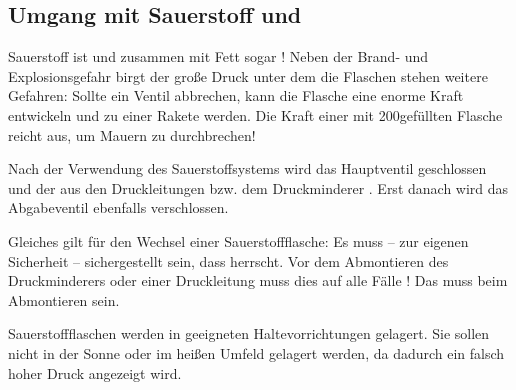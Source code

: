 \subsection{Umgang mit Sauerstoff und }

\TextSlide{\TxGefahren}
{%
Sauerstoff ist  und zusammen mit Fett
sogar ! Neben der Brand- und
Explosionsgefahr birgt der große Druck unter dem die Flaschen
stehen weitere Gefahren: Sollte ein Ventil abbrechen, kann die
Flasche eine enorme Kraft entwickeln und zu einer Rakete
werden. Die Kraft einer mit 200\Bar* gefüllten Flasche reicht
aus, um Mauern zu durchbrechen!


}{
}{}{}{}

{Nach der Verwendung des Sauerstoffsystems wird das
Hauptventil geschlossen und der  aus den
Druckleitungen bzw. dem Druckminderer . Erst
danach wird das Abgabeventil ebenfalls verschlossen.

Gleiches gilt für den Wechsel einer Sauerstoffflasche: Es
muss -- zur eigenen Sicherheit -- sichergestellt sein, dass
 herrscht. Vor
dem Abmontieren des Druckminderers oder einer Druckleitung
muss dies auf alle Fälle ! Das  muss beim Abmontieren
 sein.



}{
}{}{}{}

{
Sauerstoffflaschen werden in geeigneten
Haltevorrichtungen gelagert. Sie sollen nicht in der Sonne
oder im heißen Umfeld gelagert werden, da dadurch ein
falsch hoher Druck angezeigt wird.
}{}
{}{}{}

